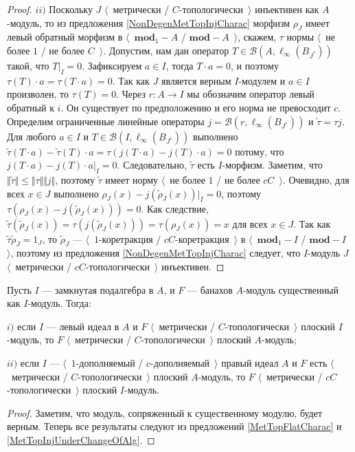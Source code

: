\begin{proof}
$ii)$ Поскольку $J$ $\langle$~метрически / $C$-топологически~$\rangle$ инъективен как $A$-модуль, то из предложения \ref{NonDegenMetTopInjCharac} морфизм $\rho_J$ имеет левый обратный морфизм в $\langle$~$\mathbf{mod}_1-A$ / $\mathbf{mod}-A$~$\rangle$, скажем, $\tau $ нормы $\langle$~не более $1$ / не более $C$~$\rangle$. Допустим, нам дан оператор $T\in \mathcal{B}(A,\ell_\infty(B_{J^*}))$ такой, что $T|_I=0$. Зафиксируем $a\in I$, тогда $T\cdot a=0$, и поэтому $\tau (T)\cdot a=\tau (T\cdot a)=0$. Так как $J$ является верным $I$-модулем и $a\in I$ произволен, то $\tau (T)=0$. Через $r:A\to I$  мы обозначим оператор левый обратный к $i$. Он существует по предположению и его норма не превосходит $c$. Определим ограниченные линейные операторы $j=\mathcal{B}(r,\ell_\infty(B_{J^*}))$ и $\widetilde{\tau}=\tau  j$. Для любого $a\in I$ и $T\in\mathcal{B}(I,\ell_\infty(B_{J^*}))$ выполнено $\widetilde{\tau}(T\cdot a)-\widetilde{\tau}(T)\cdot a=\tau (j(T\cdot a)-j(T)\cdot a)=0$ потому, что $j(T\cdot a)-j(T)\cdot a|_I=0$. Следовательно, $\widetilde{\tau}$ есть $I$-морфизм. Заметим, что $\Vert\widetilde{\tau}\Vert\leq\Vert\tau \Vert\Vert j\Vert$, поэтому $\widetilde{\tau}$ имеет норму $\langle$~не более $1$ / не более $cC$~$\rangle$. Очевидно, для всех $x\in J$ выполнено $\rho_J(x)-j(\widetilde{\rho}_J(x))|_I=0$, поэтому $\tau (\rho_J(x)-j(\widetilde{\rho}_J(x)))=0$. Как следствие, $\widetilde{\tau}(\widetilde{\rho}_J(x))=\tau (j(\widetilde{\rho}_J(x)))=\tau (\rho_J(x))=x$ для всех $x\in J$. Так как $\widetilde{\tau}\widetilde{\rho}_J=1_J$, то $\widetilde{\rho}_J$ --- $\langle$~$1$-коретракция / $cC$-коретракция~$\rangle$ в $\langle$~$\mathbf{mod}_1-I$ / $\mathbf{mod}-I$~$\rangle$, поэтому из предложения \ref{NonDegenMetTopInjCharac} следует, что $I$-модуль $J$ $\langle$~метрически / $cC$-топологически~$\rangle$ инъективен.
\end{proof}

\begin{proposition}\label{MetTopFlatUnderChangeOfAlg} Пусть $I$ --- замкнутая подалгебра в $A$, и $F$ --- банахов $A$-модуль существенный как $I$-модуль. Тогда:

$i)$ если $I$ --- левый идеал в $A$ и $F$ $\langle$~метрически / $C$-топологически~$\rangle$ плоский $I$-модуль, то $F$ $\langle$~метрически / $C$-топологически~$\rangle$ плоский $A$-модуль;

$ii)$ если $I$ --- $\langle$~$1$-дополняемый / $c$-дополняемый~$\rangle$ правый идеал $A$ и $F$ есть $\langle$~метрически / $C$-топологически~$\rangle$ плоский $A$-модуль, то $F$ $\langle$~метрически / $cC$-топологически~$\rangle$ плоский $I$-модуль.
\end{proposition}
\begin{proof} Заметим, что модуль, сопряженный к существенному модулю, будет верным. Теперь все результаты следуют из предложений \ref{MetTopFlatCharac} и \ref{MetTopInjUnderChangeOfAlg}.
\end{proof}

